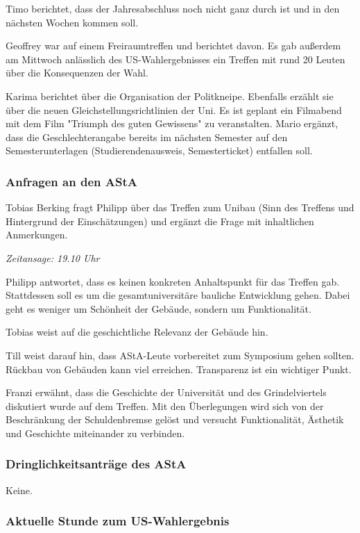 \documentclass[ngerman,headheight=70pt]{scrartcl}
\begin{document}
    Timo berichtet, dass der Jahresabschluss noch nicht ganz durch ist und in den
    nächsten Wochen kommen soll.

    Geoffrey war auf einem Freiraumtreffen und berichtet davon. Es gab außerdem
    am Mittwoch anlässlich des US-Wahlergebnisses ein Treffen mit rund 20 Leuten
    über die Konsequenzen der Wahl.

    Karima berichtet über die Organisation der Politkneipe. Ebenfalls erzählt sie
    über die neuen Gleichstellungsrichtlinien der Uni. Es ist geplant ein Filmabend
    mit dem Film "Triumph des guten Gewissens" zu veranstalten.
    Mario ergänzt, dass die Geschlechterangabe bereits im nächsten Semester auf
    den Semesterunterlagen (Studierendenausweis, Semesterticket) entfallen
    soll.

    \subsubsection{Anfragen an den AStA}

    Tobias Berking fragt Philipp über das Treffen zum Unibau (Sinn des Treffens
    und Hintergrund der Einschätzungen) und ergänzt die Frage
    mit inhaltlichen Anmerkungen.

    \textit{Zeitansage: 19.10 Uhr}

    Philipp antwortet, dass es keinen konkreten Anhaltspunkt für das Treffen gab.
    Stattdessen soll es um die gesamtuniversitäre bauliche Entwicklung gehen.
    Dabei geht es weniger um Schönheit der Gebäude, sondern um Funktionalität.

    Tobias weist auf die geschichtliche Relevanz der Gebäude hin.

    Till weist darauf hin, dass AStA-Leute vorbereitet zum Symposium gehen sollten.
    Rückbau von Gebäuden kann viel erreichen. Transparenz ist ein wichtiger Punkt.

    Franzi erwähnt, dass die Geschichte der Universität und des Grindelviertels
    diskutiert wurde auf dem Treffen. Mit den Überlegungen wird sich von der
    Beschränkung der Schuldenbremse gelöst und versucht Funktionalität, Ästhetik
    und Geschichte miteinander zu verbinden.

    \subsubsection{Dringlichkeitsanträge des AStA}

    Keine.

    \subsubsection{Aktuelle Stunde zum US-Wahlergebnis}
\end{document}
